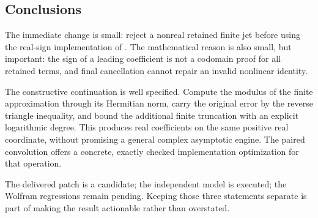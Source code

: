 \documentclass[11pt]{article}
\newcommand{\code}[1]{\texttt{\detokenize{#1}}}
\theoremstyle{remark}\newtheorem{remark}[theorem]{Remark}
\begin{document}
\subsection{Conclusions}
The immediate change is small: reject a nonreal retained finite jet before
using the real-sign implementation of \code{Abs}. The mathematical reason is
also small, but important: the sign of a leading coefficient is not a codomain
proof for all retained terms, and final cancellation cannot repair an invalid
nonlinear identity.

The constructive continuation is well specified. Compute the modulus of the
finite approximation through its Hermitian norm, carry the original error by
the reverse triangle inequality, and bound the additional finite truncation
with an explicit logarithmic degree. This produces real coefficients on the
same positive real coordinate, without promising a general complex asymptotic
engine. The paired convolution offers a concrete, exactly checked implementation
optimization for that operation.

The delivered patch is a candidate; the independent model is executed; the
Wolfram regressions remain pending. Keeping those three statements separate is
part of making the result actionable rather than overstated.

\appendix
\end{document}
